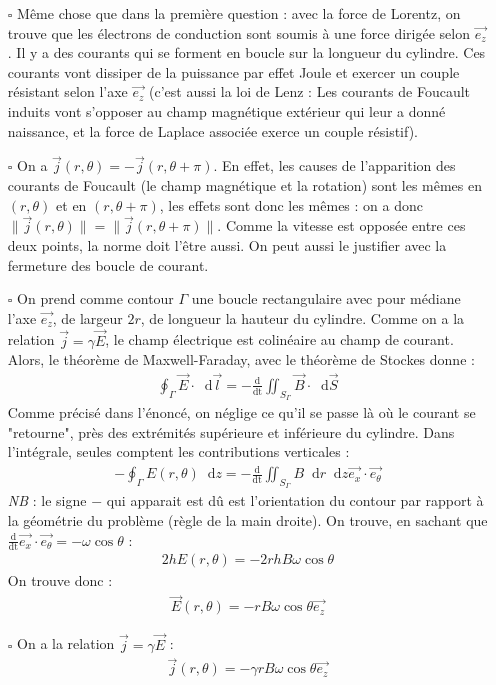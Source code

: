 \documentclass{report}
\newcommand*\dif{\mathop{}\!\mathrm{d}}
\begin{document}
\begin{itemize}
	
		\item[$\square$] Même chose que dans la première question : avec la force de Lorentz, on trouve que les électrons de conduction sont soumis à une force dirigée selon $\vec{e_z}$. Il y a des courants qui se forment en boucle sur la longueur du cylindre. Ces courants vont dissiper de la puissance par effet Joule et exercer un couple résistant selon l'axe $\vec{e_z}$ (c'est aussi la loi de Lenz : Les courants de Foucault induits vont s'opposer au champ magnétique extérieur qui leur a donné naissance, et la force de Laplace associée exerce un couple résistif).

		\item[$\square$] On a $\vec{j}(r,\theta)=-\vec{j}(r,\theta+\pi)$. En effet, les causes de l'apparition des courants de Foucault (le champ magnétique et la rotation) sont les mêmes en $(r,\theta)$ et en $(r,\theta+\pi)$, les effets sont donc les mêmes : on a donc $\parallel\vec{j}(r,\theta)\parallel=\parallel\vec{j}(r,\theta+\pi)\parallel$. Comme la vitesse est opposée entre ces deux points, la norme doit l'être aussi. On peut aussi le justifier avec la fermeture des boucle de courant.
		
		\item[$\square$] On prend comme contour $\Gamma$ une boucle rectangulaire avec pour médiane l'axe $\vec{e_z}$, de largeur $2r$, de longueur la hauteur du cylindre. Comme on a la relation $\vec{j}=\gamma\vec{E}$, le champ électrique est colinéaire au champ de courant. Alors, le théorème de Maxwell-Faraday, avec le théorème de Stockes donne :
		\begin{align*}			
			\oint_\Gamma \vec{E}\cdot\dif\vec{l}=-\frac{\mathrm{d}}{\mathrm{dt}}\iint_{S_{\Gamma}}\vec{B}\cdot\dif\vec{S}	
		\end{align*}
		Comme précisé dans l'énoncé, on néglige ce qu'il se passe là où le courant se "retourne", près des extrémités supérieure et inférieure du cylindre. Dans l'intégrale, seules comptent les contributions verticales :
			\begin{align*}			
			-\oint_\Gamma E(r,\theta)\dif z=-\frac{\mathrm{d}}{\mathrm{dt}}\iint_{S_{\Gamma}}B\dif r\dif z\vec{e_x}\cdot\vec{e_\theta}	
		\end{align*}
		\textit{NB} : le signe $-$ qui apparait est dû est l'orientation du contour par rapport à la géométrie du problème (règle de la main droite).
		On trouve, en sachant que $\frac{\mathrm{d}}{\mathrm{dt}}\vec{e_x}\cdot\vec{e_\theta}=-\omega\cos\theta$ :
		\begin{align*}			
			2hE(r,\theta)=-2rhB\omega\cos\theta
		\end{align*}
		On trouve donc : 
		\begin{align*}			
			\vec{E}(r,\theta)=-rB\omega\cos\theta\vec{e_z}
		\end{align*}
		\item[$\square$] On a la relation $\vec{j}=\gamma\vec{E}$ :
		\begin{align*}			
			\vec{j}(r,\theta)=-\gamma rB\omega\cos\theta\vec{e_z}
		\end{align*}
		

\end{itemize}
\end{document}
